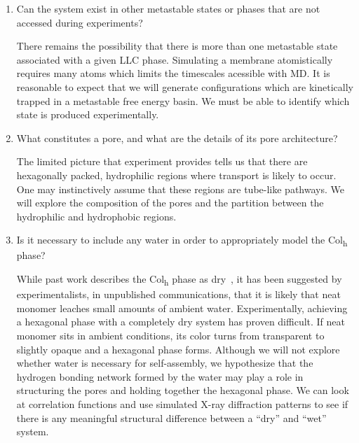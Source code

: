 \documentclass[journal=jpcbfk,manusciprt=article]{achemso}
\begin{document}
\begin{enumerate}
  \item Can the system exist in other metastable states or phases that are not
  accessed during experiments? \label{point:metastable}
  
  There remains the possibility that there is more than one metastable state
  associated with a given LLC phase. Simulating a membrane atomistically
  requires many atoms which limits the timescales acessible with MD. It is
  reasonable to expect that we will generate configurations which are kinetically
  trapped in a metastable free energy basin. We must be able to identify which
  state is produced experimentally.

  \item What constitutes a pore, and what are the details of its pore architecture? \label{point:poredefinition}

  The limited picture that experiment provides tells us that there are
  hexagonally packed, hydrophilic regions where transport is likely to occur.
  One may instinctively assume that these regions are tube-like pathways. We will
  explore the composition of the pores and the partition between the
  hydrophilic and hydrophobic regions. 

  \item Is it necessary to include any water in order to appropriately model
  the Col\textsubscript{h} phase? \label{point:water}

  While past work describes the Col\textsubscript{h} phase as dry~\cite{feng_scalable_2014}, 
  it has been suggested by experimentalists, in
  unpublished communications, that it is likely that neat monomer leaches small
  amounts of ambient water. Experimentally, achieving a hexagonal phase with a
  completely dry system has proven difficult. If neat monomer sits in ambient
  conditions, its color turns from transparent to slightly opaque and a hexagonal
  phase forms. Although we will not explore whether water is necessary for
  self-assembly, we hypothesize that the hydrogen bonding network formed by the
  water may play a role in structuring the pores and holding together the
  hexagonal phase. We can look at correlation functions and use simulated X-ray
  diffraction patterns to see if there is any meaningful structural difference
  between a ``dry'' and ``wet'' system.

  \end{enumerate}
  
 
\end{document}
